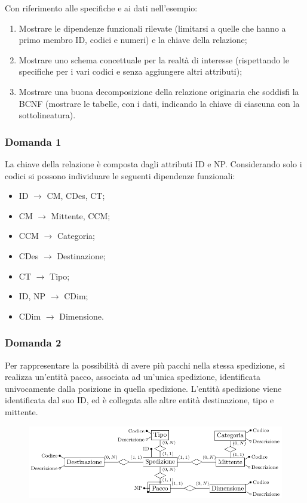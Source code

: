 \documentclass{article}
\numberwithin{equation}{subsection}
\begin{document}
Con riferimento alle specifiche e ai dati nell'esempio:
\begin{enumerate}
    \item Mostrare le dipendenze funzionali rilevate (limitarsi a quelle che hanno a primo membro ID, codici e
    numeri) e la chiave della relazione;
    \item Mostrare uno schema concettuale per la realtà di interesse (rispettando le specifiche per i vari codici e
    senza aggiungere altri attributi);
    \item Mostrare una buona decomposizione della relazione originaria che soddisfi la BCNF (mostrare le tabelle,
    con i dati, indicando la chiave di ciascuna con la sottolineatura).    
\end{enumerate}

\subsubsection*{Domanda 1}

La chiave della relazione è composta dagli attributi ID e NP. Considerando solo i codici si possono individuare le seguenti dipendenze funzionali:
\begin{itemize}
    \item ID $\to$ CM, CDes, CT;
    \item CM $\to$ Mittente, CCM;
    \item CCM $\to$ Categoria;
    \item CDes $\to$ Destinazione;
    \item CT $\to$ Tipo;
    \item ID, NP $\to$ CDim;
    \item CDim $\to$ Dimensione.
\end{itemize}

\subsubsection*{Domanda 2}

Per rappresentare la possibilità di avere più pacchi nella stessa spedizione, si realizza un'entità pacco, associata ad un'unica spedizione, identificata univocamente dalla posizione in quella spedizione. L'entità spedizione viene identificata dal suo ID, ed è collegata alle altre entità destinazione, tipo e mittente. 

\begin{figure}[H]%
    \centering%
    \includegraphics{schema_3_13-12-24.pdf}%
\end{figure}
\end{document}
